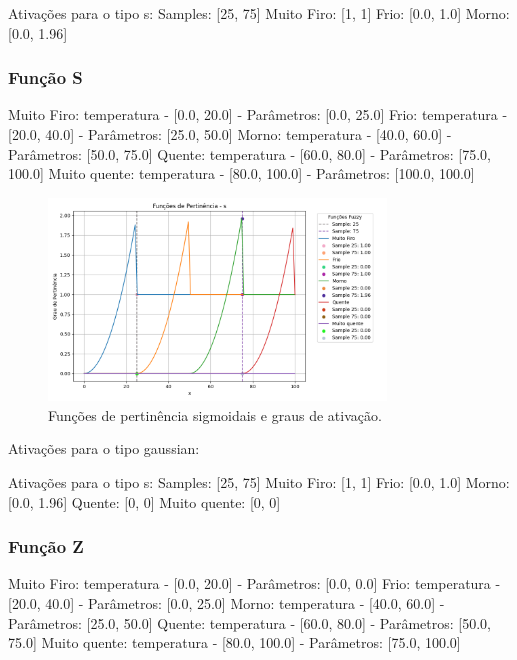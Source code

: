 \documentclass[a4paper,12pt]{article}
\begin{document}
Ativações para o tipo s:
Samples: [25, 75]
Muito Firo: [1, 1]
Frio: [0.0, 1.0]
Morno: [0.0, 1.96]

\subsubsection{Função S}

Muito Firo: temperatura - [0.0, 20.0] - Parâmetros: [0.0, 25.0]
Frio: temperatura - [20.0, 40.0] - Parâmetros: [25.0, 50.0]
Morno: temperatura - [40.0, 60.0] - Parâmetros: [50.0, 75.0]
Quente: temperatura - [60.0, 80.0] - Parâmetros: [75.0, 100.0]
Muito quente: temperatura - [80.0, 100.0] - Parâmetros: [100.0, 100.0]

\begin{figure}[H]
    \centering
    \includegraphics[width=0.8\textwidth]{img/funções_de_pertinência_s_fuzzificado.png}
    \caption{Funções de pertinência sigmoidais e graus de ativação.}
\end{figure}
Ativações para o tipo gaussian:

Ativações para o tipo s:
Samples: [25, 75]
Muito Firo: [1, 1]
Frio: [0.0, 1.0]
Morno: [0.0, 1.96]
Quente: [0, 0]
Muito quente: [0, 0]

\subsubsection{Função Z}

Muito Firo: temperatura - [0.0, 20.0] - Parâmetros: [0.0, 0.0]
Frio: temperatura - [20.0, 40.0] - Parâmetros: [0.0, 25.0]
Morno: temperatura - [40.0, 60.0] - Parâmetros: [25.0, 50.0]
Quente: temperatura - [60.0, 80.0] - Parâmetros: [50.0, 75.0]
Muito quente: temperatura - [80.0, 100.0] - Parâmetros: [75.0, 100.0]
\end{document}

